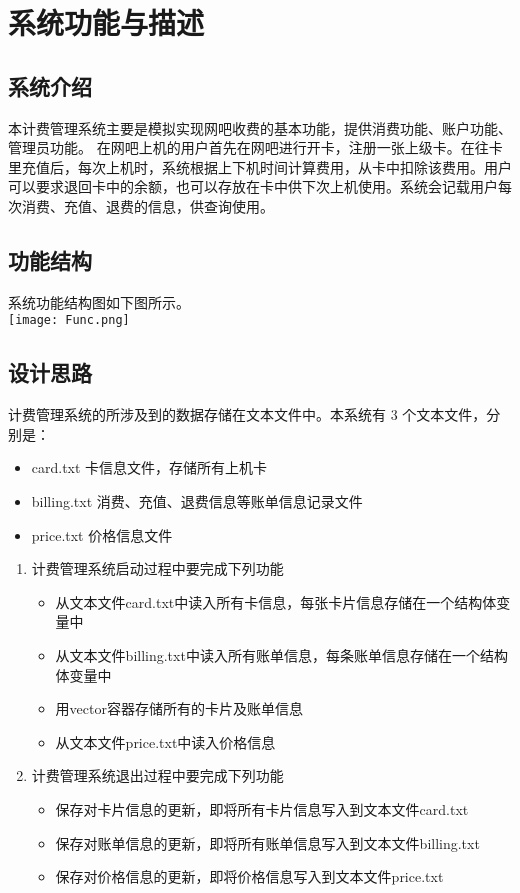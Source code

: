 \documentclass[UTF8]{ctexart}
\begin{document}
	\section{系统功能与描述}
	\subsection{系统介绍}
	\qquad 本计费管理系统主要是模拟实现网吧收费的基本功能，提供消费功能、账户功能、管理员功能。
	\qquad 在网吧上机的用户首先在网吧进行开卡，注册一张上级卡。在往卡里充值后，每次上机时，系统根据上下机时间计算费用，从卡中扣除该费用。用户可以要求退回卡中的余额，也可以存放在卡中供下次上机使用。系统会记载用户每次消费、充值、退费的信息，供查询使用。 \\
	
	\subsection{功能结构}
	\qquad 系统功能结构图如下图所示。\\
	\texttt{[image: Func.png]} \\
	
	\subsection{设计思路}
	\qquad 计费管理系统的所涉及到的数据存储在文本文件中。本系统有 3 个文本文件，分别是：
	\begin{itemize}[leftmargin=3em]
		\item card.txt 卡信息文件，存储所有上机卡
		\item billing.txt 消费、充值、退费信息等账单信息记录文件
		\item price.txt 价格信息文件
	\end{itemize}
	\begin{enumerate}[label=\arabic*),leftmargin=3em]
		\item 计费管理系统启动过程中要完成下列功能
		\begin{itemize}
			\item 从文本文件card.txt中读入所有卡信息，每张卡片信息存储在一个结构体变量中
			\item 从文本文件billing.txt中读入所有账单信息，每条账单信息存储在一个结构体变量中
			\item 用vector容器存储所有的卡片及账单信息
			\item 从文本文件price.txt中读入价格信息
		\end{itemize}
		\item 计费管理系统退出过程中要完成下列功能
		\begin{itemize}
			\item 保存对卡片信息的更新，即将所有卡片信息写入到文本文件card.txt
			\item 保存对账单信息的更新，即将所有账单信息写入到文本文件billing.txt
			\item 保存对价格信息的更新，即将价格信息写入到文本文件price.txt
		\end{itemize}
	\end{enumerate}
	
\end{document}
